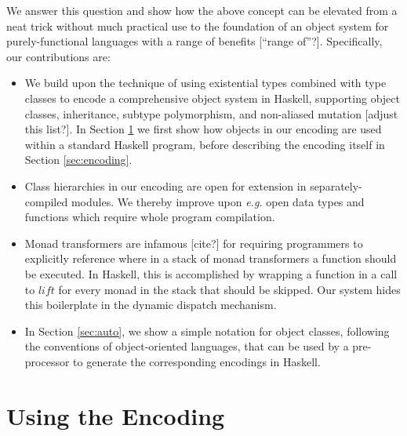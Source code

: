 \documentclass[runningheads,a4paper]{llncs}
\newcommand{\todo}[1]{[{\color{blue}#1}]}
\begin{document}
We answer this question and show how the above concept can be elevated from a neat trick without much practical use to the foundation of an object system for purely-functional languages with a range of benefits \todo{``range of''?}. Specifically, our contributions are:
\begin{itemize}
\item We build upon the technique of using existential types combined with type classes to encode a comprehensive object system in Haskell, supporting object classes, inheritance, subtype polymorphism, and non-aliased mutation \todo{adjust this list?}. In Section \ref{sec:usage} we first show how objects in our encoding are used within a standard Haskell program, before describing the encoding itself in Section \ref{sec:encoding}.
\item Class hierarchies in our encoding are open for extension in separately-compiled modules. We thereby improve upon \emph{e.g.} open data types and functions\cite{loh2006open} which require whole program compilation.
\item \todo{Alan: monad stacks?}Monad transformers are infamous \todo{cite?} for requiring programmers to explicitly reference where in a stack of monad transformers a function should be executed. In Haskell, this is accomplished by wrapping a function in a call to $\mathit{lift}$ for every monad in the stack that should be skipped. Our system hides this boilerplate in the dynamic dispatch mechanism. 
\item In Section \ref{sec:auto}, we show a simple notation for object classes, following the conventions of object-oriented languages, that can be used by a pre-processor to generate the corresponding encodings in Haskell.
\end{itemize}

\section{Using the Encoding}
\label{sec:usage}
\end{document}
